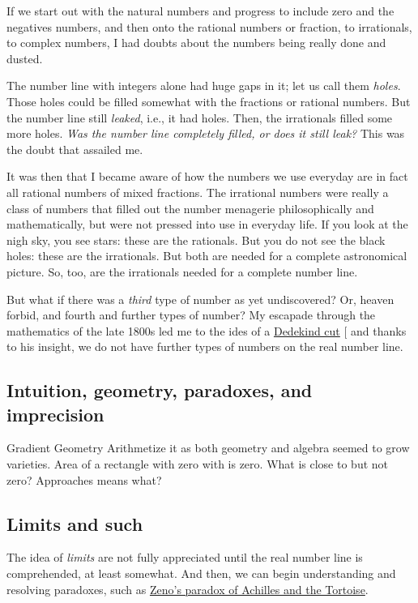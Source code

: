 \documentclass[
  a4paper,
]{article}
\begin{document}
If we start out with the natural numbers and progress to include zero
and the negatives numbers, and then onto the rational numbers or
fraction, to irrationals, to complex numbers, I had doubts about the
numbers being really done and dusted.

The number line with integers alone had huge gaps in it; let us call
them \emph{holes}. Those holes could be filled somewhat with the
fractions or rational numbers. But the number line still \emph{leaked},
i.e., it had holes. Then, the irrationals filled some more holes.
\emph{Was the number line completely filled, or does it still leak?}
This was the doubt that assailed me.

It was then that I became aware of how the numbers we use everyday are
in fact all rational numbers of mixed fractions. The irrational numbers
were really a class of numbers that filled out the number menagerie
philosophically and mathematically, but were not pressed into use in
everyday life. If you look at the nigh sky, you see stars: these are the
rationals. But you do not see the black holes: these are the
irrationals. But both are needed for a complete astronomical picture.
So, too, are the irrationals needed for a complete number line.

But what if there was a \emph{third} type of number as yet undiscovered?
Or, heaven forbid, and fourth and further types of number? My escapade
through the mathematics of the late 1800s led me to the ides of a
\href{https://en.wikipedia.org/wiki/Dedekind_cut}{Dedekind cut}
{[}\citeproc{ref-dedekind}{1}{]} and thanks to his insight, we do not
have further types of numbers on the real number line.

\subsection{Intuition, geometry, paradoxes, and
imprecision}\label{intuition-geometry-paradoxes-and-imprecision}

Gradient Geometry Arithmetize it as both geometry and algebra seemed to
grow varieties. Area of a rectangle with zero with is zero. What is
close to but not zero? Approaches means what?

\subsection{Limits and such}\label{limits-and-such}

The idea of \emph{limits} are not fully appreciated until the real
number line is comprehended, at least somewhat. And then, we can begin
understanding and resolving paradoxes, such as
\href{https://en.wikipedia.org/wiki/Zeno's_paradoxes}{Zeno's paradox of
Achilles and the Tortoise}.
\end{document}

